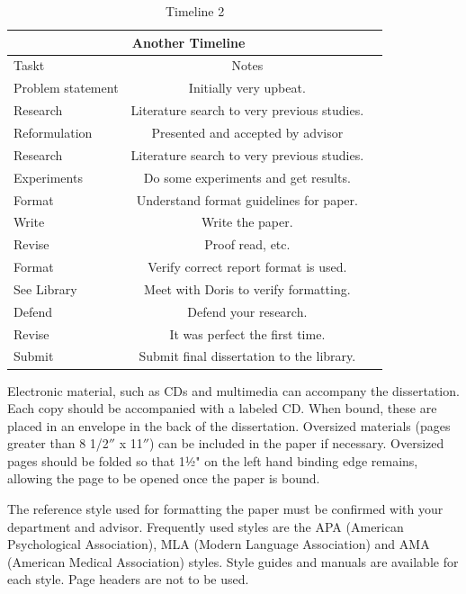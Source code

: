 \documentclass[12pt]{report}
\begin{document}
\begin{table}[htp]

\begin{center}
\begin{tabular}{|l|c|p{3.0in}|}
\hline
\multicolumn{2}{|c|}{Another Timeline}\\ \hline
Taskt&Notes\\ \hline
Problem statement&Initially very upbeat.\\ \hline
Research&Literature search to very previous studies.\\ \hline
Reformulation&Presented and accepted by advisor\\ \hline
Research&Literature search to very previous  studies.\\ \hline
Experiments&Do some experiments and get results.\\ \hline
Format&Understand format guidelines for paper.\\ \hline
Write&Write the paper.\\ \hline
Revise&Proof read, etc.\\ \hline
Format&Verify correct report format is used.\\ \hline
See Library&Meet with Doris to verify formatting.\\ \hline
Defend&Defend your research.\\ \hline
Revise&It was perfect the first time.\\ \hline
Submit&Submit final dissertation to the library.\\ \hline
\end{tabular}
\end{center} 
\caption{Timeline 2}\label{fig:erptsqfit}
\end{table}

Electronic material, such as CDs and multimedia can accompany the dissertation. Each copy should be accompanied with a labeled CD. When bound, these are placed in an envelope in the back of the dissertation.  Oversized materials (pages greater than 8 1/2$''$ x 11$''$) can be included in the paper if necessary. Oversized pages should be folded so that 1½" on the left hand binding edge remains, allowing the page to be opened once the paper is bound.

The reference style used for formatting the paper must be confirmed with your department and advisor. Frequently used styles are the APA (American Psychological Association), MLA (Modern Language Association) and AMA (American Medical Association) styles. Style guides and manuals are available for each style. Page headers are not to be used.
\end{document}

